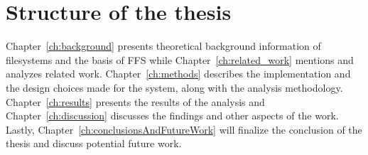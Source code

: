 \section{Structure of the thesis} %
Chapter~\ref{ch:background} presents theoretical background information of filesystems and the basis of FFS while Chapter~\ref{ch:related_work} mentions and analyzes related work. Chapter~\ref{ch:methods} describes the implementation and the design choices made for the system, along with the analysis methodology. Chapter~\ref{ch:results} presents the results of the analysis and Chapter~\ref{ch:discussion} discusses the findings and other aspects of the work. Lastly, Chapter~\ref{ch:conclusionsAndFutureWork} will finalize the conclusion of the thesis and discuss potential future work.